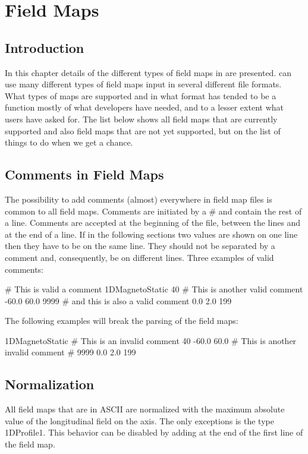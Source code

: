 

\chapter{\opalt Field Maps}

\section{Introduction}
\label{chp:app_fieldmaps}
In this chapter details of the different types of field maps in \opalt are presented. \opalt can use many different types of
field maps input in several different file formats. What types of maps are supported and in what format has tended to be a function
mostly of what developers have needed, and to a lesser extent what users have asked for. The list below shows all field maps that
are currently supported and also field maps that are not yet supported, but on the list of things to do when we get a chance.

\section{Comments in Field Maps}
The possibility to add comments (almost)
everywhere in field map files is common to all field maps. Comments are initiated by a \# and contain the rest of a line. Comments are
accepted at the beginning of the file, between the lines and at the end of a line. If in the following sections two values are
shown on one line then they have to be on the same line. They should not be separated by a comment and, consequently, be on
different lines. Three examples of valid comments:
\begin{example}
# This is valid a comment
1DMagnetoStatic 40 # This is another valid comment
-60.0 60.0 9999
  # and this is also a valid comment
0.0 2.0 199
\end{example}
The following examples will break the parsing of the field maps:
\begin{example}
1DMagnetoStatic # This is an invalid comment
40
-60.0 60.0 # This is another invalid comment # 9999
0.0 2.0 199
\end{example}

\section{Normalization}
All field maps that are in ASCII are normalized with the maximum absolute value of the longitudinal field on the axis. The only exceptions is the type 1DProfile1. This behavior can be disabled by adding  at the end of the first line of the field map.

